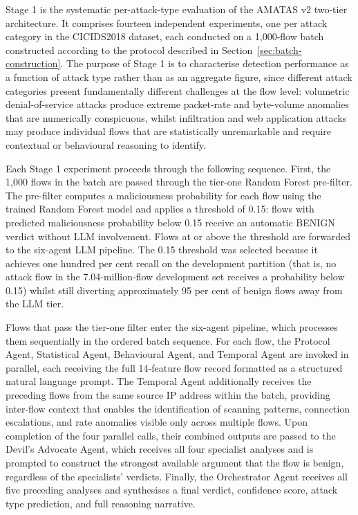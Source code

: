 Stage 1 is the systematic per-attack-type evaluation of the AMATAS v2 two-tier architecture. It comprises fourteen independent experiments, one per attack category in the CICIDS2018 dataset, each conducted on a 1,000-flow batch constructed according to the protocol described in Section~\ref{sec:batch-construction}. The purpose of Stage 1 is to characterise detection performance as a function of attack type rather than as an aggregate figure, since different attack categories present fundamentally different challenges at the flow level: volumetric denial-of-service attacks produce extreme packet-rate and byte-volume anomalies that are numerically conspicuous, whilst infiltration and web application attacks may produce individual flows that are statistically unremarkable and require contextual or behavioural reasoning to identify.

Each Stage 1 experiment proceeds through the following sequence. First, the 1,000 flows in the batch are passed through the tier-one Random Forest pre-filter. The pre-filter computes a maliciousness probability for each flow using the trained Random Forest model and applies a threshold of 0.15: flows with predicted maliciousness probability below 0.15 receive an automatic BENIGN verdict without LLM involvement. Flows at or above the threshold are forwarded to the six-agent LLM pipeline. The 0.15 threshold was selected because it achieves one hundred per cent recall on the development partition (that is, no attack flow in the 7.04-million-flow development set receives a probability below 0.15) whilst still diverting approximately 95 per cent of benign flows away from the LLM tier.

Flows that pass the tier-one filter enter the six-agent pipeline, which processes them sequentially in the ordered batch sequence. For each flow, the Protocol Agent, Statistical Agent, Behavioural Agent, and Temporal Agent are invoked in parallel, each receiving the full 14-feature flow record formatted as a structured natural language prompt. The Temporal Agent additionally receives the preceding flows from the same source IP address within the batch, providing inter-flow context that enables the identification of scanning patterns, connection escalations, and rate anomalies visible only across multiple flows. Upon completion of the four parallel calls, their combined outputs are passed to the Devil's Advocate Agent, which receives all four specialist analyses and is prompted to construct the strongest available argument that the flow is benign, regardless of the specialists' verdicts. Finally, the Orchestrator Agent receives all five preceding analyses and synthesises a final verdict, confidence score, attack type prediction, and full reasoning narrative.

